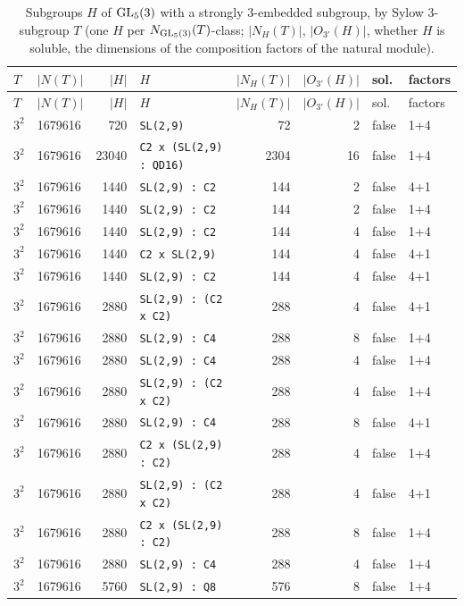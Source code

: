 \begin{longtable}{llrlrrll}
\caption{Subgroups $H$ of $\mathrm{GL}_5(3)$ with a strongly $3$-embedded subgroup, by Sylow $3$-subgroup $T$ (one $H$ per $N_{\mathrm{GL}_5(3)}(T)$-class; $|N_H(T)|$, $|O_{3'}(H)|$, whether $H$ is soluble, the dimensions of the composition factors of the natural module).}\label{tab:gl5}\\
\toprule
$T$ & $|N(T)|$ & $|H|$ & $H$ & $|N_H(T)|$ & $|O_{3'}(H)|$ & sol. & factors\\
\midrule
\endfirsthead
\toprule
$T$ & $|N(T)|$ & $|H|$ & $H$ & $|N_H(T)|$ & $|O_{3'}(H)|$ & sol. & factors\\
\midrule
\endhead
\bottomrule
\endfoot
$3^2$ & 1679616 & 720 & \texttt{SL(2,9)} & 72 & 2 & false & 1+4\\
$3^2$ & 1679616 & 23040 & \texttt{C2 x (SL(2,9) : QD16)} & 2304 & 16 & false & 1+4\\
$3^2$ & 1679616 & 1440 & \texttt{SL(2,9) : C2} & 144 & 2 & false & 4+1\\
$3^2$ & 1679616 & 1440 & \texttt{SL(2,9) : C2} & 144 & 2 & false & 1+4\\
$3^2$ & 1679616 & 1440 & \texttt{SL(2,9) : C2} & 144 & 4 & false & 1+4\\
$3^2$ & 1679616 & 1440 & \texttt{C2 x SL(2,9)} & 144 & 4 & false & 4+1\\
$3^2$ & 1679616 & 1440 & \texttt{SL(2,9) : C2} & 144 & 4 & false & 4+1\\
$3^2$ & 1679616 & 2880 & \texttt{SL(2,9) : (C2 x C2)} & 288 & 4 & false & 4+1\\
$3^2$ & 1679616 & 2880 & \texttt{SL(2,9) : C4} & 288 & 8 & false & 1+4\\
$3^2$ & 1679616 & 2880 & \texttt{SL(2,9) : C4} & 288 & 4 & false & 1+4\\
$3^2$ & 1679616 & 2880 & \texttt{SL(2,9) : (C2 x C2)} & 288 & 4 & false & 1+4\\
$3^2$ & 1679616 & 2880 & \texttt{SL(2,9) : C4} & 288 & 8 & false & 4+1\\
$3^2$ & 1679616 & 2880 & \texttt{C2 x (SL(2,9) : C2)} & 288 & 4 & false & 1+4\\
$3^2$ & 1679616 & 2880 & \texttt{SL(2,9) : (C2 x C2)} & 288 & 4 & false & 4+1\\
$3^2$ & 1679616 & 2880 & \texttt{C2 x (SL(2,9) : C2)} & 288 & 8 & false & 1+4\\
$3^2$ & 1679616 & 2880 & \texttt{SL(2,9) : C4} & 288 & 4 & false & 1+4\\
$3^2$ & 1679616 & 5760 & \texttt{SL(2,9) : Q8} & 576 & 8 & false & 1+4\\

\end{longtable}
